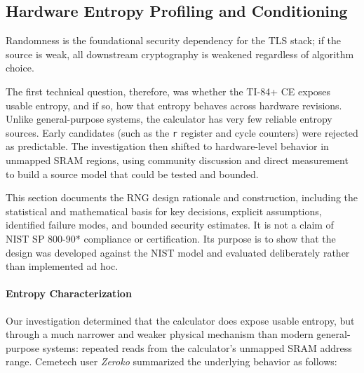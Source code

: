 \documentclass[titlepage]{report}
\begin{document}
	\subsection{Hardware Entropy Profiling and Conditioning}
	\label{ssec:hwrng_design}
	\label{sec:entropy}
	\label{ssec:entropy}
	
	Randomness is the foundational security dependency for the TLS stack; if the source is weak, all downstream cryptography is weakened regardless of algorithm choice.
	
	The first technical question, therefore, was whether the TI-84+ CE exposes usable entropy, and if so, how that entropy behaves across hardware revisions. Unlike general-purpose systems, the calculator has very few reliable entropy sources. Early candidates (such as the \texttt{r} register and cycle counters) were rejected as predictable. The investigation then shifted to hardware-level behavior in unmapped SRAM regions, using community discussion and direct measurement to build a source model that could be tested and bounded.

	This section documents the RNG design rationale and construction, including the statistical and mathematical basis for key decisions, explicit assumptions, identified failure modes, and bounded security estimates. It is not a claim of NIST SP 800-90* compliance or certification. Its purpose is to show that the design was developed against the NIST model and evaluated deliberately rather than implemented ad hoc.

	\paragraph{Entropy Characterization}
	Our investigation determined that the calculator does expose usable entropy, but through a much narrower and weaker physical mechanism than modern general-purpose systems: repeated reads from the calculator's unmapped SRAM address range. Cemetech user \textit{Zeroko} summarized the underlying behavior as follows:
	
\end{document}
